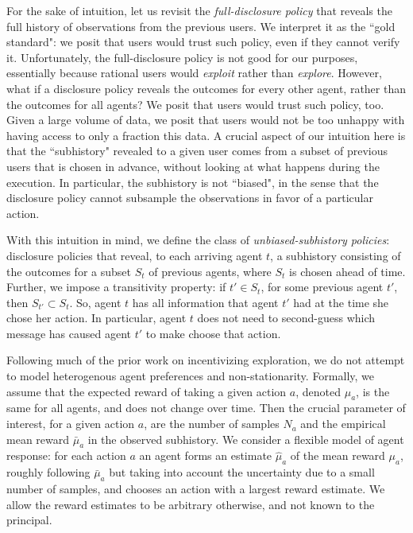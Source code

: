 For the sake of intuition, let us revisit the \emph{full-disclosure policy} that reveals the full history of observations from the previous users. We interpret it as the ``gold standard": we posit that users would trust such policy, even if they cannot verify it. Unfortunately, the full-disclosure policy is not good for our purposes, essentially because rational users would \emph{exploit} rather than \emph{explore}. However, what if a disclosure policy reveals the outcomes for every other agent, rather than the outcomes for all agents? We posit that users would trust such policy, too. Given a large volume of data, we posit that users would not be too unhappy with having access to only a fraction this data. A crucial aspect of our intuition here is that the ``subhistory" revealed to a given user comes from a subset of previous users that is chosen in advance, without looking at what happens during the execution. In particular, the subhistory is not ``biased", in the sense that the disclosure policy cannot subsample the observations in favor of a particular action.

With this intuition in mind, we define the class of \emph{unbiased-subhistory policies}: disclosure policies that reveal, to each arriving agent $t$, a subhistory  consisting of the outcomes for a subset $S_t$ of previous agents, where $S_t$ is chosen ahead of time. Further, we impose a transitivity property: if $t' \in S_t$, for some previous agent $t'$, then $S_{t'}\subset S_t$. So, agent $t$ has all information that agent $t'$ had at the time she chose her action. In particular, agent $t$ does not need to second-guess which message has caused agent $t'$ to make choose that action.

Following much of the prior work on incentivizing exploration, we do not attempt to model heterogenous agent preferences and non-stationarity. Formally, we assume that the expected reward of taking a given action $a$, denoted $\mu_a$, is the same for all agents, and does not change over time. Then the crucial parameter of interest, for a given action $a$, are the number of samples $N_a$ and the empirical mean reward $\bar{\mu}_a$ in the observed subhistory. We consider a flexible model of agent response: for each action $a$ an agent forms an estimate $\hat{\mu}_a$ of the mean reward $\mu_a$, roughly following $\bar{\mu}_a$ but taking into account the uncertainty due to a small number of samples, and chooses an action with a largest reward estimate. We allow the reward estimates to be arbitrary otherwise, and not known to the principal. 

